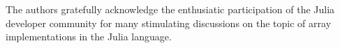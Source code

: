 \documentclass[preprint]{sigplanconf}
\begin{document}
%

\acks

The authors gratefully acknowledge the enthusiatic participation of the Julia developer community for many stimulating discussions on the topic of array implementations in the Julia language.


{}





\end{document}

